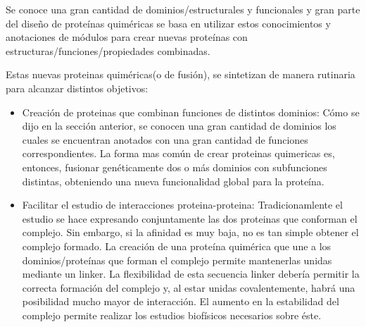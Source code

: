 Se conoce una gran cantidad de dominios/estructurales y funcionales y gran parte del diseño de  proteínas quiméricas se basa en utilizar estos conocimientos y anotaciones de módulos 
para crear nuevas proteínas con estructuras/funciones/propiedades combinadas.

Estas nuevas proteinas quiméricas(o de fusión), se sintetizan de manera rutinaria para alcanzar distintos objetivos:

\begin{itemize}
 \item Creación de proteinas que combinan funciones de distintos dominios:
Cómo se dijo en la sección anterior, se conocen una gran cantidad de dominios los cuales se encuentran anotados con una gran cantidad de funciones correspondientes.
La forma mas común de crear proteinas quimericas es, entonces, fusionar genéticamente dos o más dominios con subfunciones distintas, obteniendo una nueva funcionalidad global para la proteína.
\item Facilitar el estudio de interacciones proteina-proteina\cite{reddy2013linkers}: 
Tradicionamlente el estudio se hace expresando conjuntamente las dos proteinas que conforman el complejo.
Sin embargo, si la afinidad es muy baja, no es tan simple obtener el complejo formado.
La creación de una proteína quimérica que une a los dominios/proteínas que forman el complejo permite mantenerlas unidas mediante un linker.
La flexibilidad de esta secuencia linker debería permitir la correcta formación del complejo y, al estar unidas covalentemente, habrá una posibilidad mucho mayor de interacción.
El aumento en la estabilidad del complejo permite realizar los estudios biofísicos necesarios sobre éste.

\end{itemize}
